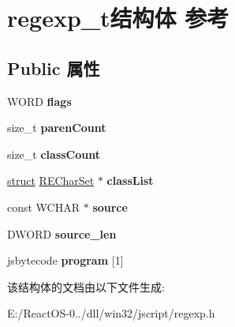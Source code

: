 \hypertarget{structregexp__t}{}\section{regexp\+\_\+t结构体 参考}
\label{structregexp__t}
\subsection*{Public 属性}
\begin{DoxyCompactItemize}
\item 
\mbox{\label{structregexp__t_a8045376f71bb2a72fedbe6b7ad583e48}} 
W\+O\+RD {\bfseries flags}
\item 
\mbox{\label{structregexp__t_a80f987b3904f9d91f203441462ed8db3}} 
size\+\_\+t {\bfseries paren\+Count}
\item 
\mbox{\label{structregexp__t_af72adf2670ce7a257ec6ca828c507661}} 
size\+\_\+t {\bfseries class\+Count}
\item 
\mbox{\label{structregexp__t_a3fa808a977644bce4c0a0d8970e088bb}} 
\hyperlink{interfacestruct}{struct} \hyperlink{struct_r_e_char_set}{R\+E\+Char\+Set} $\ast$ {\bfseries class\+List}
\item 
\mbox{\label{structregexp__t_a4d2ebb0636e8d595c01bee0708e528ab}} 
const W\+C\+H\+AR $\ast$ {\bfseries source}
\item 
\mbox{\label{structregexp__t_a54bd14c7772545c7346bb700301b7739}} 
D\+W\+O\+RD {\bfseries source\+\_\+len}
\item 
\mbox{\label{structregexp__t_a336125bc8c5970cf102b04d89370bb13}} 
jsbytecode {\bfseries program} \mbox{[}1\mbox{]}
\end{DoxyCompactItemize}


该结构体的文档由以下文件生成\+:\begin{DoxyCompactItemize}
\item 
E\+:/\+React\+O\+S-\/0../dll/win32/jscript/regexp.\+h\end{DoxyCompactItemize}

